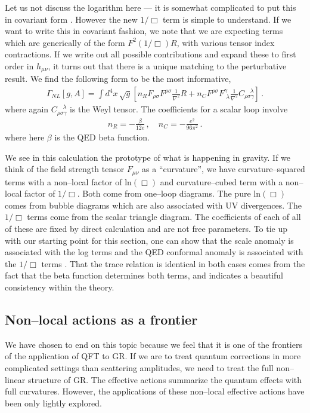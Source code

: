 \documentclass[12pt]{article}
\begin{document}
Let us not discuss the logarithm here --- it is somewhat complicated to put this in covariant form \cite{Donoghue:2015xla, Donoghue:2015nba}. However the new $1/\Box$ term is simple to understand. If we want to write this in covariant fashion, we note that we are expecting terms which are generically of the form $F^2 (1/\Box)R$, with various tensor index contractions. If we write out all possible contributions and expand these to first order in $h_{\mu\nu}$, it turns out that there is a unique matching to the perturbative result.
We find the following form to be the most informative,
\begin{align}
\Gamma_{NL}[g,A] = \int d^4x \, \sqrt{g} \left[n_R F_{\rho\sigma}F^{\rho\sigma}\frac{1}{\nabla^2} R  + n_C F^{\rho\sigma} F^{\gamma}_{\, \, \lambda} \frac{1}{\nabla^2}C_{\rho\sigma\gamma}^{\quad \lambda} \right]  \,.
\label{nonlinearcompletion}
\end{align}
where again $C_{\rho\sigma\gamma}^{\quad \lambda} $ is the Weyl tensor. The coefficients for a scalar loop involve
\begin{align}
n_R = - \frac{\beta}{12 e} \,, \quad n_C =  - \frac{e^2}{96 \pi^2} \,.
\end{align}
where here $\beta$ is the QED beta function.

We see in this calculation the prototype of what is happening in gravity. If we think of the field strength tensor $F_{\mu\nu}$ as a ``curvature'', we have curvature--squared terms with a non--local factor of $\text{ln}(\Box)$ and curvature--cubed term with a non--local factor of $1/\Box$. Both come from one--loop diagrams. The pure $\text{ln}( \Box)$ comes from bubble diagrams which are also associated with UV divergences. The
$1/\Box$ terms come from the scalar triangle diagram. The coefficients of each of all of these are fixed by direct calculation and are not free parameters. To tie up with our starting point for this section, one can show that the scale anomaly is associated with the log terms and the QED conformal anomaly is associated with the $1/\Box$ terms \cite{Donoghue:2015xla}. That the trace relation is identical in both cases comes from the fact that the beta function determines both terms, and indicates a beautiful consistency within the theory.

\subsection{Non--local actions as a frontier}

We have chosen to end on this topic because we feel that it is one of the frontiers of the application of QFT to GR. If we are to treat quantum corrections in more complicated settings than scattering amplitudes, we need to treat the full non--linear structure of GR. The effective actions summarize the quantum effects with full curvatures. However, the applications of these non--local effective actions have been only lightly explored.
\end{document}
